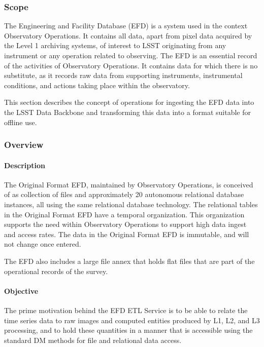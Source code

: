 ﻿\subsubsection{Scope}

The Engineering and Facility Database (EFD) is a system used in the
context Observatory Operations. It contains all data, apart from pixel
data acquired by the Level 1 archiving systems, of interest to LSST
originating from any instrument or any operation related to
observing. The EFD is an essential record of the activities of
Observatory Operations. It contains data for which there is no
substitute, as it records raw data from supporting instruments,
instrumental conditions, and actions taking place within the
observatory.

This section describes the concept of operations for ingesting the
EFD data into the LSST Data Backbone and transforming this data
into a format suitable for offline use.

\subsubsection{Overview}

\paragraph{Description}

The Original Format EFD, maintained by Observatory Operations, is
conceived of as collection of files and approximately 20 autonomous
relational database instances, all using the same relational database
technology. The relational tables in the Original Format EFD have a
temporal organization. This organization supports the need within
Observatory Operations to support high data ingest and access
rates. The data in the Original Format EFD is immutable, and will not
change once entered.

The EFD also includes a large file annex that holds flat files that
are part of the operational records of the survey.

\paragraph{Objective}

The prime motivation behind the EFD ETL Service is to be able to
relate the time series data to raw images and computed entities
produced by L1, L2, and L3 processing, and to hold these quantities in
a manner that is accessible using the standard DM methods for file and
relational data access.

